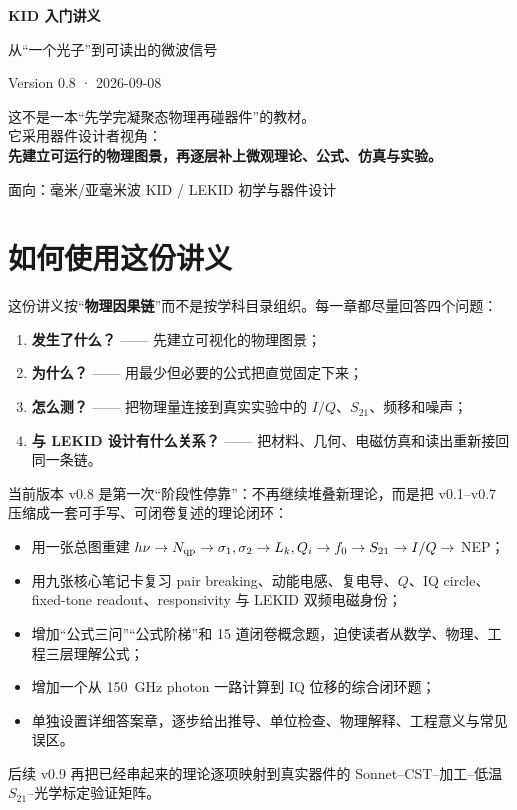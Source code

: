 \documentclass[11pt,a4paper,openany]{ctexrep}
\newcommand{\Stwentyone}{S_{21}}
\begin{document}
\begin{titlepage}
\centering
\vspace*{2.2cm}
{\fontsize{30}{38}\selectfont\bfseries\color{KidDark} KID 入门讲义}\par
\vspace{0.5cm}
{\Large\color{KidBlue} 从“一个光子”到可读出的微波信号}\par
\vspace{1.4cm}
{\large Version 0.8 · 2026-09-08}\par
\vfill
\begin{tcolorbox}[width=0.88\textwidth,colback=KidGray,colframe=KidBlue!55,arc=3mm]
\centering
\large
这不是一本“先学完凝聚态物理再碰器件”的教材。\\[0.5em]
它采用器件设计者视角：\\[0.3em]
\textbf{先建立可运行的物理图景，再逐层补上微观理论、公式、仿真与实验。}
\end{tcolorbox}
\vfill
{\large 面向：毫米/亚毫米波 KID / LEKID 初学与器件设计}\par
\end{titlepage}

\tableofcontents
\clearpage

\chapter*{如何使用这份讲义}
这份讲义按“\textbf{物理因果链}”而不是按学科目录组织。每一章都尽量回答四个问题：
\begin{enumerate}
  \item \textbf{发生了什么？} —— 先建立可视化的物理图景；
  \item \textbf{为什么？} —— 用最少但必要的公式把直觉固定下来；
  \item \textbf{怎么测？} —— 把物理量连接到真实实验中的 $I/Q$、$\Stwentyone$、频移和噪声；
  \item \textbf{与 LEKID 设计有什么关系？} —— 把材料、几何、电磁仿真和读出重新接回同一条链。
\end{enumerate}

当前版本 v0.8 是第一次“阶段性停靠”：不再继续堆叠新理论，而是把 v0.1--v0.7 压缩成一套可手写、可闭卷复述的理论闭环：
\begin{itemize}
  \item 用一张总图重建 $h\nu\rightarrow N_{\rm qp}\rightarrow\sigma_1,\sigma_2\rightarrow L_k,Q_i\rightarrow f_0\rightarrow S_{21}\rightarrow I/Q\rightarrow$ NEP；
  \item 用九张核心笔记卡复习 pair breaking、动能电感、复电导、$Q$、IQ circle、fixed-tone readout、responsivity 与 LEKID 双频电磁身份；
  \item 增加“公式三问”“公式阶梯”和 15 道闭卷概念题，迫使读者从数学、物理、工程三层理解公式；
  \item 增加一个从 \SI{150}{GHz} photon 一路计算到 IQ 位移的综合闭环题；
  \item 单独设置详细答案章，逐步给出推导、单位检查、物理解释、工程意义与常见误区。
\end{itemize}
后续 v0.9 再把已经串起来的理论逐项映射到真实器件的 Sonnet--CST--加工--低温 $S_{21}$--光学标定验证矩阵。
\end{document}
